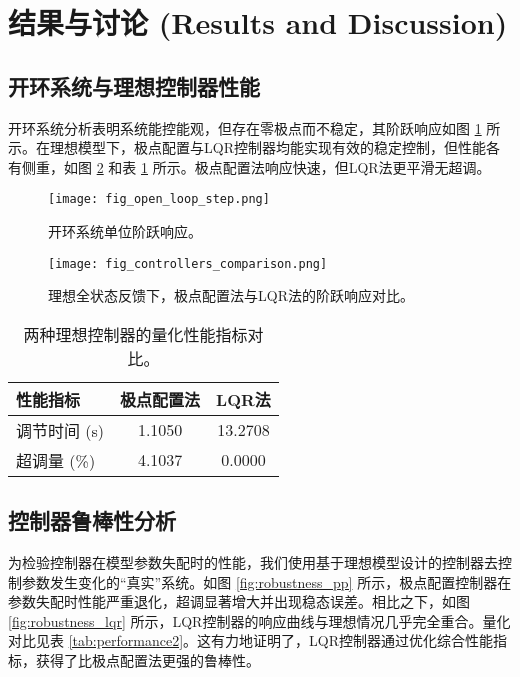 \documentclass[12pt, a4paper]{article}
\begin{document}
\section{结果与讨论 (Results and Discussion)}

\subsection{开环系统与理想控制器性能}
开环系统分析表明系统能控能观，但存在零极点而不稳定，其阶跃响应如图 \ref{fig:open_loop} 所示。在理想模型下，极点配置与LQR控制器均能实现有效的稳定控制，但性能各有侧重，如图 \ref{fig:controllers_comparison} 和表 \ref{tab:performance1} 所示。极点配置法响应快速，但LQR法更平滑无超调。

\begin{figure}[htbp!]
    \centering
    \texttt{[image: fig\_open\_loop\_step.png]}
    \caption{开环系统单位阶跃响应。}
    \label{fig:open_loop}
\end{figure}

\begin{figure}[htbp!]
    \centering
    \texttt{[image: fig\_controllers\_comparison.png]}
    \caption{理想全状态反馈下，极点配置法与LQR法的阶跃响应对比。}
    \label{fig:controllers_comparison}
\end{figure}

\begin{table}[htbp!]
    \centering
    \caption{两种理想控制器的量化性能指标对比。}
    \label{tab:performance1}
    \begin{tabular}{lcc}
        \toprule
        \textbf{性能指标} & \textbf{极点配置法} & \textbf{LQR法} \\
        \midrule
        调节时间 (s) & 1.1050 & 13.2708 \\
        超调量 (\%) & 4.1037 & 0.0000 \\
        \bottomrule
    \end{tabular}
\end{table}

\subsection{控制器鲁棒性分析}
为检验控制器在模型参数失配时的性能，我们使用基于理想模型设计的控制器去控制参数发生变化的“真实”系统。如图 \ref{fig:robustness_pp} 所示，极点配置控制器在参数失配时性能严重退化，超调显著增大并出现稳态误差。相比之下，如图 \ref{fig:robustness_lqr} 所示，LQR控制器的响应曲线与理想情况几乎完全重合。量化对比见表 \ref{tab:performance2}。这有力地证明了，LQR控制器通过优化综合性能指标，获得了比极点配置法更强的鲁棒性。
\end{document}
